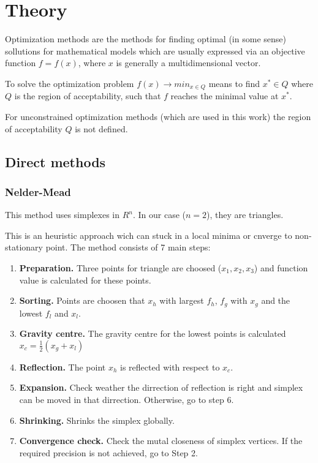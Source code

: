 \section*{Theory}

Optimization methods are the methods for finding optimal (in some sense) sollutions
for mathematical models which are usually expressed via an objective function $f = f(x)$, where $x$ is generally a multidimensional vector.

To solve the optimization problem $f(x) \rightarrow min_{x\in Q}$ means to find $x^{*} \in Q$ where $Q$ is the region of acceptability, such  that $f$ reaches the minimal value at $x^{*}$.

For unconstrained optimization methods (which are used in this work) the region of acceptability $Q$ is not defined.

\subsection*{Direct methods}
\subsubsection*{Nelder-Mead}

This method uses simplexes in $R^n$. In our case ($n = 2$), they are triangles.

This is an heuristic approach wich can stuck in a local minima or cnverge to non-stationary point.
The method consists of 7 main steps:
\begin{enumerate}
    \item \textbf{Preparation.} Three points for triangle are choosed ($x_1, x_2, x_3$) and function value is calculated for these points.
    \item \textbf{Sorting.} Points are choosen that $x_h$ with largest $f_h$, $f_g$ with $x_g$ and the lowest $f_l$ and $x_l$.
    \item \textbf{Gravity centre.} The gravity centre for the lowest points is calculated $x_c = \frac{1}{2}(x_g + x_l)$
    \item \textbf{Reflection.} The point $x_h$ is reflected with respect to $x_c$.
    \item \textbf{Expansion.} Check weather the dirrection of reflection is right and simplex can be moved in that dirrection. Otherwise, go to step 6.
    \item \textbf{Shrinking.} Shrinks the simplex globally.
    \item \textbf{Convergence check.} Check the mutal closeness of simplex vertices. If the required precision is not achieved, go to Step 2.
\end{enumerate}

